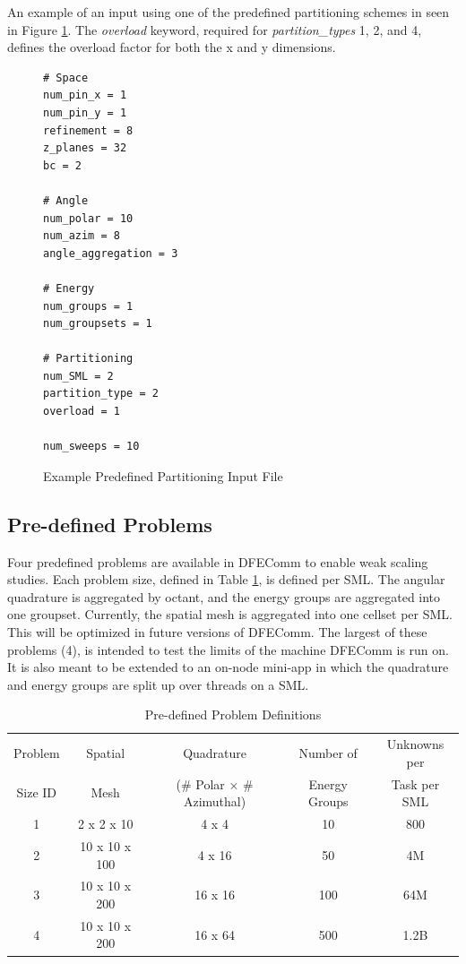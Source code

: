 \documentclass{article}
\begin{document}
An example of an input using one of the predefined partitioning schemes in seen in Figure \ref{fig::partition}. The \emph{overload} keyword, required for \emph{partition\_types} 1, 2, and 4, defines the overload factor for both the x and y dimensions. \\

\begin{figure}[htbp]
\begin{verbatim}
# Space
num_pin_x = 1
num_pin_y = 1
refinement = 8
z_planes = 32
bc = 2

# Angle
num_polar = 10
num_azim = 8
angle_aggregation = 3

# Energy
num_groups = 1
num_groupsets = 1
  	
# Partitioning
num_SML = 2
partition_type = 2	
overload = 1

num_sweeps = 10
 \end{verbatim}  
    \caption[]{Example Predefined Partitioning Input File}\label{fig::partition}
\end{figure}

\subsection{Pre-defined Problems} \label{probdef}
Four predefined problems are available in DFEComm to enable weak scaling studies. Each problem size, defined in Table \ref{table::probsize}, is defined per SML. The angular quadrature is aggregated by octant, and the energy groups are aggregated into one groupset. Currently, the spatial mesh is aggregated into one cellset per SML. This will be optimized in future versions of DFEComm. The largest of these problems (4), is intended to test the limits of the machine DFEComm is run on. It is also meant to be extended to an on-node mini-app in which the quadrature and energy groups are split up over threads on a SML.\\ \newline

\begin{table}[H]
\begin{center}
  \begin{tabular}{ |c| c | c|c| c|}
    \hline
    Problem & Spatial & Quadrature& Number of & Unknowns per \\ 
    Size ID & Mesh& (\# Polar $\times$ \# Azimuthal) &  Energy Groups & Task per SML\\
    \hline
    1 & 2 x 2 x 10 & 4 x 4 & 10 & 800\\ 
    2 & 10 x 10 x 100 & 4 x 16 & 50& 4M\\
    3 & 10 x 10 x 200& 16 x 16 & 100& 64M \\
    4 & 10 x 10 x 200& 16 x 64 & 500 & 1.2B \\
    \hline
  \end{tabular} 
      \caption{Pre-defined Problem Definitions}
      \label{table::probsize}
\end{center}
\end{table}
\end{document}
